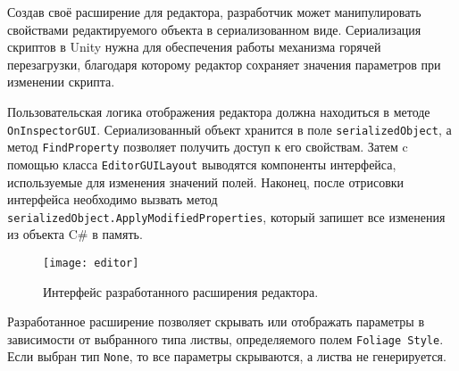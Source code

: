 Создав своё расширение для редактора, разработчик может манипулировать свойствами редактируемого объекта в сериализованном виде. Сериализация скриптов в Unity нужна для обеспечения работы механизма горячей перезагрузки, благодаря которому редактор сохраняет значения параметров при изменении скрипта. 

Пользовательская логика отображения редактора должна находиться в методе \texttt{OnInspectorGUI}. Сериализованный объект хранится в поле \texttt{serializedObject}, а метод \texttt{FindProperty} позволяет получить доступ к его свойствам. Затем c помощью класса \texttt{EditorGUILayout} выводятся компоненты интерфейса, используемые для изменения значений полей. Наконец, после отрисовки интерфейса необходимо вызвать метод \texttt{serializedObject.ApplyModifiedProperties}, который запишет все изменения из объекта C\# в память.

\begin{figure}[!htb]
    \centering
    \texttt{[image: editor]}
    \caption{Интерфейс разработанного расширения редактора.}
\end{figure}

Разработанное расширение позволяет скрывать или отображать  параметры в зависимости от выбранного типа листвы, определяемого полем \texttt{Foliage Style}. Если выбран тип \texttt{None}, то все параметры скрываются, а листва не генерируется.

\newpage
